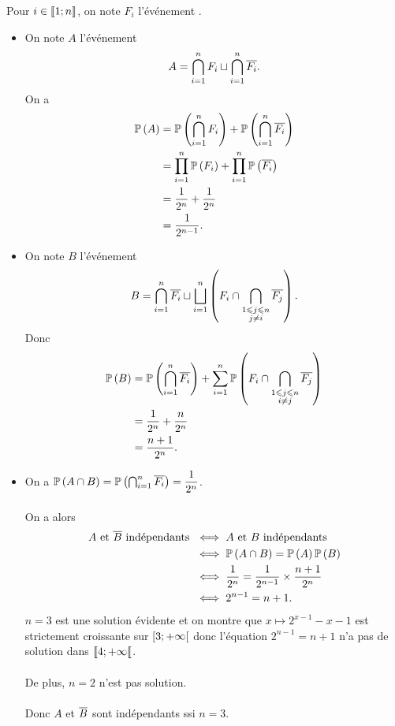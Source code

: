 \begin{corr}
Pour \(i\in\left\llbracket1;n\right\rrbracket\), on note \(F_i\) l'événement .

\begin{itemize}
    \item On note \(A\) l'événement  \ie \[A=\bigcap_{i=1}^nF_i\sqcup\bigcap_{i=1}^n\overline{F_i}.\] On a \[\begin{aligned}
        \mathbb{P}\left(A\right)&=\mathbb{P}\left(\bigcap_{i=1}^nF_i\right)+\mathbb{P}\left(\bigcap_{i=1}^n\overline{F_i}\right) \\
        &=\prod_{i=1}^n\mathbb{P}\left(F_i\right)+\prod_{i=1}^n\mathbb{P}\left(\overline{F_i}\right) \\
        &=\dfrac{1}{2^n}+\dfrac{1}{2^n} \\
        &=\dfrac{1}{2^{n-1}}.
    \end{aligned}\]
    \item On note \(B\) l'événement  \ie \[B=\bigcap_{i=1}^n\overline{F_i}\sqcup\bigsqcup_{i=1}^n\left(F_i\cap\bigcap_{\substack{1\leqslant j\leqslant n \\ j\not=i}}\overline{F_j}\right).\] Donc \[\begin{aligned}
        \mathbb{P}\left(B\right)&=\mathbb{P}\left(\bigcap_{i=1}^n\overline{F_i}\right)+\sum_{i=1}^n\mathbb{P}\left(F_i\cap\bigcap_{\substack{1\leqslant j\leqslant n \\ i\not=j}}\overline{F_j}\right) \\
        &=\dfrac{1}{2^n}+\dfrac{n}{2^n} \\
        &=\dfrac{n+1}{2^n}.
    \end{aligned}\]
    \item On a \(\mathbb{P}\left(A\cap B\right)=\mathbb{P}\left(\bigcap_{i=1}^n\overline{F_i}\right)=\dfrac{1}{2^n}\). \\\\ On a alors \[\begin{aligned}
        A\text{ et }\overline{B}\text{ indépendants }&\iff A\text{ et }B\text{ indépendants} \\
        &\iff\mathbb{P}\left(A\cap B\right)=\mathbb{P}\left(A\right)\mathbb{P}\left(B\right) \\
        &\iff\dfrac{1}{2^n}=\dfrac{1}{2^{n-1}}\times\dfrac{n+1}{2^n} \\
        &\iff2^{n-1}=n+1.
    \end{aligned}\] \(n=3\) est une solution évidente et on montre que \(x\mapsto2^{x-1}-x-1\) est strictement croissante sur \(\left[3;+\infty\right[\) donc l'équation \(2^{n-1}=n+1\) n'a pas de solution dans \(\left\llbracket4;+\infty\right\llbracket\). \\\\ De plus, \(n=2\) n'est pas solution. \\\\ Donc \(A\) et \(\overline{B}\) sont indépendants ssi \(n=3\).
\end{itemize}
\end{corr}

